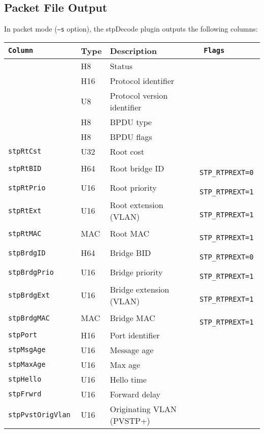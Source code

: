 \documentclass[documentation]{subfiles}
\begin{document}
\subsection{Packet File Output}
In packet mode ({\tt --s} option), the stpDecode plugin outputs the following columns:
\begin{longtable}{>{\tt}lll>{\tt\small}l}
    \toprule
    {\bf Column} & {\bf Type} & {\bf Description} & {\bf Flags}\\
    \midrule\endhead%
    \nameref{stpStat}  & H8  & Status                      & \\
    \nameref{stpProto} & H16 & Protocol identifier         & \\
    \nameref{stpVer}   & U8  & Protocol version identifier & \\
    \nameref{stpType}  & H8  & BPDU type                   & \\
    \nameref{stpFlags} & H8  & BPDU flags                  & \\
    stpRtCst           & U32 & Root cost                   & \\
    stpRtBID           & H64 & Root bridge ID              & STP\_RTPREXT=0\\
    stpRtPrio          & U16 & Root priority               & STP\_RTPREXT=1\\
    stpRtExt           & U16 & Root extension (VLAN)       & STP\_RTPREXT=1\\
    stpRtMAC           & MAC & Root MAC                    & STP\_RTPREXT=1\\
    stpBrdgID          & H64 & Bridge BID                  & STP\_RTPREXT=0\\
    stpBrdgPrio        & U16 & Bridge priority             & STP\_RTPREXT=1\\
    stpBrdgExt         & U16 & Bridge extension (VLAN)     & STP\_RTPREXT=1\\
    stpBrdgMAC         & MAC & Bridge MAC                  & STP\_RTPREXT=1\\
    stpPort            & H16 & Port identifier             & \\
    stpMsgAge          & U16 & Message age                 & \\
    stpMaxAge          & U16 & Max age                     & \\
    stpHello           & U16 & Hello time                  & \\
    stpFrwrd           & U16 & Forward delay               & \\
    stpPvstOrigVlan    & U16 & Originating VLAN (PVSTP+)   & \\
    \bottomrule
\end{longtable}
\end{document}
